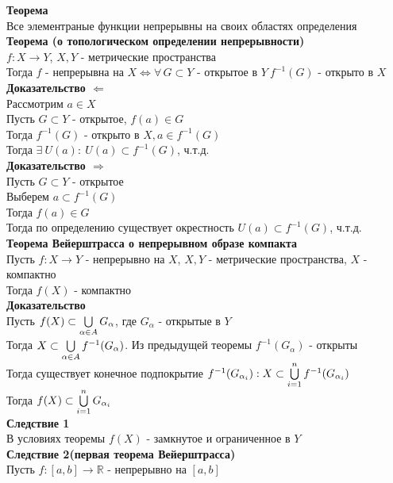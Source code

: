 \documentclass[12pt]{article}
\begin{document}
\textbf{Теорема}\\
Все элементраные функции непрерывны на своих областях определения\\
\textbf{Теорема (о топологическом определении непрерывности)}\\
$f: X \rightarrow Y$, $X, Y$ - метрические пространства\\
Тогда $f$ - непрерывна на $X \Leftrightarrow \forall\,G\subset Y$ - открытое в $Y\ f^{-1}(G)$ - открыто в $X$\\
\textbf{Доказательство $\Leftarrow$}\\
Рассмотрим $a \in X$\\
Пусть $G\subset Y$ - открытое, $f(a) \in G$\\
Тогда $f^{-1}(G)$ - открыто в $X, a \in f^{-1}(G)$\\
Тогда $\exists\ U(a):\ U(a) \subset f^{-1}(G)$, ч.т.д.\\
\textbf{Доказательство $\Rightarrow$}\\
Пусть $G \subset Y$ - открытое\\
Выберем $a \subset f^{-1}(G)$\\
Тогда $f(a) \in G$\\
Тогда по определению существует окрестность $U(a) \subset f^{-1}(G)$, ч.т.д.\\
\textbf{Теорема Вейерштрасса о непрерывном образе компакта}\\
Пусть $f:X\rightarrow Y$ - непрерывно на $X$, $X,Y$ - метрические пространства, $X$ - компактно\\
Тогда $f(X)$ - компактно\\
\textbf{Доказательство}\\
Пусть $f(X) \subset \bigcup\limits_{\alpha \in A} G_\alpha$, где $G_\alpha$ - открытые в $Y$\\
Тогда $X \subset \bigcup\limits_{\alpha \in A} f^{-1}(G_\alpha)$. Из предыдущей теоремы $f^{-1}(G_\alpha)$ - открыты\\
Тогда существует конечное подпокрытие $f^{-1}(G_{\alpha_i}): X \subset \bigcup\limits_{i=1}^n f^{-1}(G_{\alpha_i})$\\
Тогда $f(X) \subset \bigcup\limits_{i=1}^n G_{\alpha_i}$\\
\textbf{Следствие 1}\\
В условиях теоремы $f(X)$ - замкнутое и ограниченное в $Y$\\
\textbf{Следствие 2(первая теорема Вейерштрасса)}\\
Пусть $f: [a,b] \rightarrow \mathbb{R}$ - непрерывно на $[a,b]$\\
\end{document}
